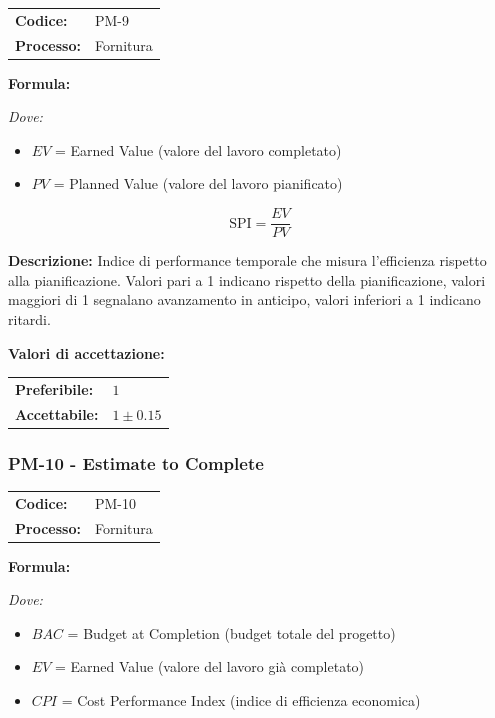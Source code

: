 \documentclass[a4paper,11pt,oneside]{scrartcl}
\begin{document}
\noindent
\begin{tabular}{@{}p{}p{}@{}}
    \textbf{Codice:}   & PM-9      \\
    \textbf{Processo:} & Fornitura \\
\end{tabular}

\vspace{0.3cm}
\noindent\textbf{Formula:}

\noindent\textit{Dove:}
\begin{itemize}[leftmargin=1.5cm, topsep=0pt, itemsep=0pt]
    \item $EV$ = Earned Value (valore del lavoro completato)
    \item $PV$ = Planned Value (valore del lavoro pianificato)
\end{itemize}

\[
    \text{SPI} = \frac{EV}{PV}
\]

\noindent\textbf{Descrizione:} Indice di performance temporale che misura l'efficienza rispetto alla pianificazione. Valori pari a 1 indicano rispetto della pianificazione, valori maggiori di 1 segnalano avanzamento in anticipo, valori inferiori a 1 indicano ritardi.

\vspace{0.2cm}
\noindent\textbf{Valori di accettazione:}
\vspace{0.1cm}

\noindent
\begin{tabular}{@{}ll@{}}
    \textbf{Preferibile:} & $1$          \\
    \textbf{Accettabile:} & $1 \pm 0.15$ \\
\end{tabular}

\subsubsection{PM-10 - Estimate to Complete}

\noindent
\begin{tabular}{@{}p{}p{}@{}}
    \textbf{Codice:}   & PM-10     \\
    \textbf{Processo:} & Fornitura \\
\end{tabular}

\vspace{0.3cm}
\noindent\textbf{Formula:}

\noindent\textit{Dove:}
\begin{itemize}[leftmargin=1.5cm, topsep=0pt, itemsep=0pt]
    \item $BAC$ = Budget at Completion (budget totale del progetto)
    \item $EV$ = Earned Value (valore del lavoro già completato)
    \item $CPI$ = Cost Performance Index (indice di efficienza economica)
\end{itemize}
\end{document}
